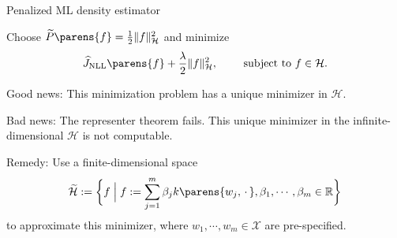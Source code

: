\documentclass[aspectratio=169,xcolor=dvipsnames]{beamer}
\newcommand{\NLL}{\mathrm{NLL}}
\newcommand{\calH}{\mathcal{H}}
\newcommand{\calX}{\mathcal{X}}
\begin{document}
\begin{frame}{Penalized ML density estimator}
	
	Choose $\widetilde{P} \parens{f} = \frac{1}{2} \Vert f \Vert_{\mathcal{H}}^2$ and minimize 
	\begin{align}
		\widehat{J}_{\NLL} \parens{f} + \frac{\lambda}{2} \Vert f \Vert_{\mathcal{H}}^2, \qquad \text{ subject to } f \in \mathcal{H}. 
	\end{align}
	
	{\color{defaultcolor}Good news:} This minimization problem has a unique minimizer in $\mathcal{H}$. 
	
	\vspace{10pt}
	
	{\color{defaultcolor}Bad news:} The representer theorem {\color{red}fails}. This unique minimizer in the infinite- dimensional $\mathcal{H}$ is {\color{red}not} computable. 
	
	\vspace{10pt}
	
	{\color{defaultcolor}Remedy:} Use a finite-dimensional space 
	\begin{align}
		\widetilde{\calH} := \bigg\{ f \Bigm| f := \sum_{j=1}^m \beta_j k \parens{w_j, \,\cdot\,}, \beta_1, \cdots, \beta_m \in \mathbb{R} \bigg\}
	\end{align}
	to approximate this minimizer, where $w_1, \cdots, w_m \in \calX$ are pre-specified. 
	
\end{frame}
\end{document}
